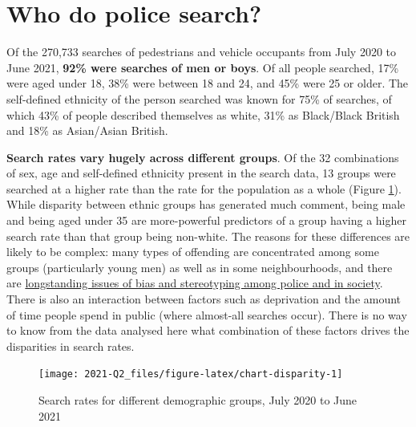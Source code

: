 \documentclass[
  a4paper,
  twoside, 11pt]{article}
\begin{document}
\hypertarget{who-do-police-search}{%
\section{Who do police search?}\label{who-do-police-search}}

Of the 270,733 searches of pedestrians and vehicle occupants from July 2020 to June 2021, \textbf{92\% were searches of men or boys}. Of all people searched, 17\% were aged under 18, 38\% were between 18 and 24, and 45\% were 25 or older. The self-defined ethnicity of the person searched was known for 75\% of searches, of which 43\% of people described themselves as white, 31\% as Black/Black British and 18\% as Asian/Asian British.

\textbf{Search rates vary hugely across different groups}. Of the 32 combinations of sex, age and self-defined ethnicity present in the search data, 13 groups were searched at a higher rate than the rate for the population as a whole (Figure \ref{fig:chart-disparity}). While disparity between ethnic groups has generated much comment, being male and being aged under 35 are more-powerful predictors of a group having a higher search rate than that group being non-white. The reasons for these differences are likely to be complex: many types of offending are concentrated among some groups (particularly young men) as well as in some neighbourhoods, and there are \href{https://www.bbc.co.uk/news/uk-47300343}{longstanding issues of bias and stereotyping among police and in society}. There is also an interaction between factors such as deprivation and the amount of time people spend in public (where almost-all searches occur). There is no way to know from the data analysed here what combination of these factors drives the disparities in search rates.



\begin{figure}[tb]

{\centering \texttt{[image: 2021-Q2\_files/figure-latex/chart-disparity-1]} 

}

\caption{Search rates for different demographic groups, July 2020 to June 2021}\label{fig:chart-disparity}
\end{figure}
\end{document}
